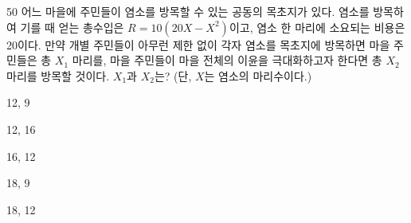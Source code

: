 \begin{question}{50}
어느 마을에 주민들이 염소를 방목할 수 있는 공동의 목초지가 있다. 염소를 방목하여 기를 때 얻는 총수입은 $R=10(20X-X^{2})$이고, 염소 한 마리에 소요되는 비용은 20이다. 만약 개별 주민들이 아무런 제한 없이 각자 염소를 목초지에 방목하면 마을 주민들은 총 $X_{1}$ 마리를, 마을 주민들이 마을 전체의 이윤을 극대화하고자 한다면 총 $X_{2}$ 마리를 방목할 것이다. $X_{1}$과 $X_{2}$는? (단, $X$는 염소의 마리수이다.)
\begin{choices}
  \item 12, 9
  \item 12, 16
  \item 16, 12
  \item 18, 9
  \item 18, 12
\end{choices}
\end{question}
